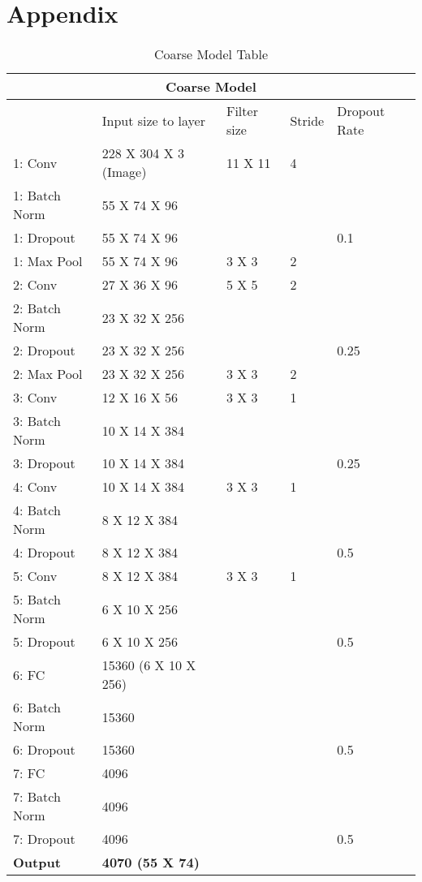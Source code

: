 \section{Appendix}
\begin{table}[h!]
\centering
\begin{tabular}{ |p{3cm}|p{4cm}|p{2cm}|p{2cm}|p{2cm}| }
 \hline
 \multicolumn{5}{|c|}{\textbf{Coarse Model}} \\
 \hline
 & Input size to layer & Filter size & Stride & Dropout Rate\\
 \hline
 1: Conv & 228 X 304 X 3 (Image) & 11 X 11 & 4 & \\
 1: Batch Norm & 55 X 74 X 96 & & & \\
 1: Dropout & 55 X 74 X 96 & & & 0.1 \\
 1: Max Pool & 55 X 74 X 96 & 3 X 3 & 2 & \\
 \hline
 2: Conv & 27 X 36 X 96 & 5 X 5 & 2 & \\
 2: Batch Norm & 23 X 32 X 256 & & & \\
 2: Dropout & 23 X 32 X 256 & & & 0.25 \\
 2: Max Pool & 23 X 32 X 256 & 3 X 3 & 2 & \\
 \hline
 3: Conv & 12 X 16 X 56 & 3 X 3 & 1 & \\
 3: Batch Norm & 10 X 14 X 384 & & & \\
 3: Dropout & 10 X 14 X 384 & & & 0.25 \\
 \hline
 4: Conv & 10 X 14 X 384 & 3 X 3 & 1 & \\
 4: Batch Norm & 8 X 12 X 384 & & & \\
 4: Dropout & 8 X 12 X 384 & & & 0.5 \\
 \hline
 5: Conv & 8 X 12 X 384 & 3 X 3 & 1 & \\
 5: Batch Norm & 6 X 10 X 256 & & & \\
 5: Dropout & 6 X 10 X 256 & & & 0.5 \\
 \hline
 6: FC & 15360 (6 X 10 X 256) & & & \\
 6: Batch Norm & 15360 & & & \\
 6: Dropout & 15360 & & & 0.5 \\
 \hline
 7: FC & 4096 & & & \\
 7: Batch Norm & 4096 & & & \\
 7: Dropout & 4096 & & & 0.5 \\
 \hline
 \textbf{Output} & \textbf{4070 (55 X 74)} & & & \\
 \hline
\end{tabular}
\caption{Coarse Model Table}
\label{table:1}
\end{table}


